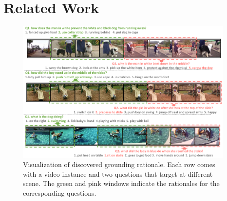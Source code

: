 \section{Related Work}
\label{sec:related}

\begin{figure}[t]
  \centering
  \includegraphics[width=0.97\textwidth]{fig/case.pdf}
 	\vspace{-13pt}
  \caption{Visualization of discovered grounding rationale. Each row comes with a video instance and two questions that target at different scene.  The \textcolor[rgb]{0,0.5,0}{green} and \textcolor[RGB]{225,152,150}{pink} windows indicate the rationales for the corresponding questions.}
  \label{fig:case-study}
 	\vspace{-10pt}
\end{figure}

